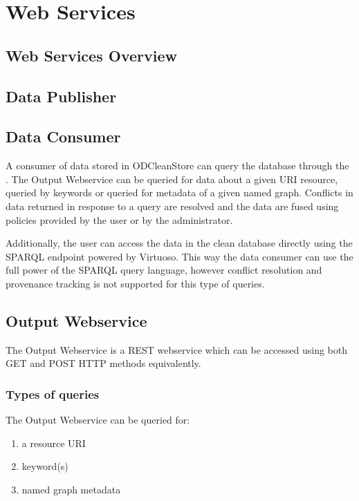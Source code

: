 \chapter{Web Services}

\section{Web Services Overview}

\section{Data Publisher}

\section{Data Consumer}

A consumer of data stored in ODCleanStore can query the database through the . The Output Webservice can be queried for data about a given URI resource, queried by keywords or queried for metadata of a given named graph. Conflicts in data returned in response to a query are resolved and the data are fused using policies provided by the user or by the administrator.

Additionally, the user can access the data in the clean database directly using the SPARQL endpoint powered by Virtuoso. This way the data consumer can use the full power of the SPARQL query language, however conflict resolution and provenance tracking is not supported for this type of queries.

\section*{Output Webservice}

The Output Webservice is a REST webservice which can be accessed using both GET and POST HTTP methods equivalently.

\subsection{Types of queries}

The Output Webservice can be queried for:

\begin{enumerate}
	\item a resource URI
	\item keyword(s)
	\item named graph metadata
\end{enumerate}

